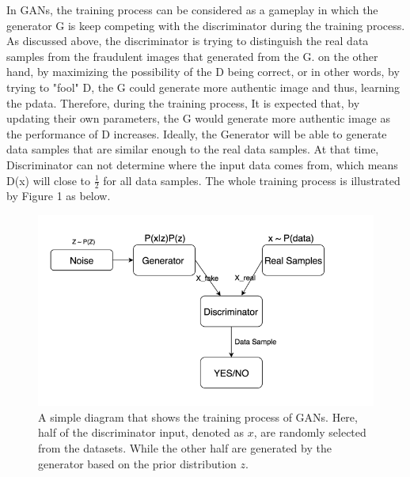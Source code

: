 \documentclass[10pt,twocolumn,letterpaper]{article}
\begin{document}
In GANs, the training process can be considered as a gameplay in which the generator G is keep competing with the discriminator during the training process. As discussed above, the discriminator is trying to distinguish the real data samples from the fraudulent images that generated from the G. on the other hand, by maximizing the possibility of the D being correct, or in other words, by trying to "fool" D, the G could generate more authentic image and thus, learning the pdata. Therefore, during the training process, It is expected that, by updating their own parameters,  the G would generate more authentic image as the performance of D increases. Ideally, the Generator will be able to generate data samples that are similar enough to the real data samples. At that time, Discriminator can not determine where the input data comes from, which means D(x) will close to $\frac{1}{2}$ for all data samples. The whole training process is illustrated by Figure 1 as below. 
\begin{figure}[h]
\begin{center}
   \includegraphics[width=\linewidth]{img/frame.png}
\end{center}
   \caption{A simple diagram that shows the training process of GANs. Here, half of the discriminator input, denoted as $x$, are randomly selected from the datasets. While the other half are generated by the generator based on the prior distribution $z$.	}
\label{fig:long}
\label{fig:onecol}
\end{figure}


\end{document}
